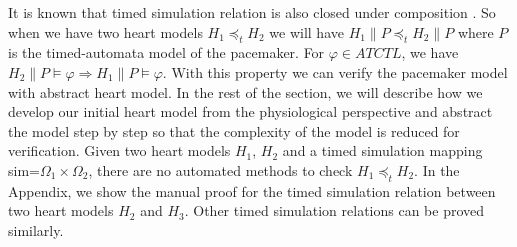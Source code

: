 It is known that timed simulation relation is also closed under composition \cite{simulation}. So when we have two heart models $H_1\preceq_t H_2$ we will have $H_1\| P\preceq_t H_2\| P$ where $P$ is the timed-automata model of the pacemaker. For $\varphi\in ATCTL$, we have $H_2\| P\models\varphi\Rightarrow H_1\| P\models\varphi$. With this property we can verify the pacemaker model with abstract heart model. In the rest of the section, we will describe how we develop our initial heart model from the physiological perspective and abstract the model step by step so that the complexity of the model is reduced for verification. Given two heart models $H_1$, $H_2$ and a timed simulation mapping \textsf{sim}=$\Omega_1\times\Omega_2$, there are no automated methods to check $H_1\preceq_t H_2$. In the Appendix, we show the manual proof for the timed simulation relation between two heart models $H_2$ and $H_3$. Other timed simulation relations can be proved similarly.
